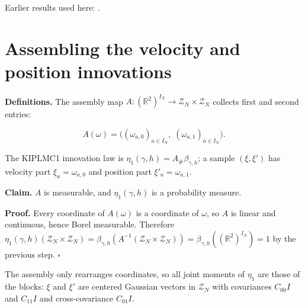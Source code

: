 \documentclass[11pt,a4paper]{article}
\begin{document}
Earlier results used here: \cite[Section~3.26.3]{LangevinLean2026Kinetic}.

\section{\texorpdfstring{Assembling the velocity and position innovations}{Assembling the velocity and position innovations}}


\textbf{Definitions.} The assembly map \(A:(\mathbb R^2)^{I_N}\to\mathcal Z_N\times\mathcal Z_N\) collects first and second entries:


\[A(\omega)=\bigl((\omega_{a,0})_{a\in I_N},\;(\omega_{a,1})_{a\in I_N}\bigr).\]


The KIPLMC1 innovation law is \(\eta_1(\gamma,h)=A_\#\beta_{\gamma,h}\); a sample \((\xi,\xi')\) has velocity part \(\xi_a=\omega_{a,0}\) and position part \(\xi'_a=\omega_{a,1}\).




\textbf{Claim.} \(A\) is measurable, and \(\eta_1(\gamma,h)\) is a probability measure.




\textbf{Proof.} Every coordinate of \(A(\omega)\) is a coordinate of \(\omega\), so \(A\) is linear and continuous, hence Borel measurable. Therefore \(\eta_1(\gamma,h)(\mathcal Z_N\times\mathcal Z_N)=\beta_{\gamma,h}(A^{-1}(\mathcal Z_N\times\mathcal Z_N))=\beta_{\gamma,h}((\mathbb R^2)^{I_N})=1\) by the previous step. \(\square\)




The assembly only rearranges coordinates, so all joint moments of \(\eta_1\) are those of the blocks: \(\xi\) and \(\xi'\) are centered Gaussian vectors in \(\mathcal Z_N\) with covariances \(C_{00}I\) and \(C_{11}I\) and cross-covariance \(C_{01}I\).
\end{document}
